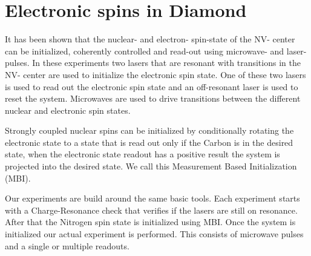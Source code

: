 \chapter{Electronic spins in Diamond}
\label{controlingspinsindiamond}




It has been shown that the nuclear- and electron- spin-state of the NV- center can be initialized, coherently controlled and read-out using microwave- and laser- pulses\citep{Robledo2011HighFidelity}. In these experiments two lasers that are resonant with transitions in the NV- center are used to initialize the electronic spin state. One of these two lasers is used to read out the electronic spin state and an off-resonant laser is used to reset the system.  Microwaves are used to drive transitions between the different nuclear and electronic spin states.

Strongly coupled nuclear spins can be initialized by conditionally rotating the electronic state to a state that is read out only if the Carbon is in the desired state, when the electronic state readout has a positive result the system is projected into the desired state. We call this Measurement Based Initialization (MBI).

%
%
Our experiments are build around the same basic tools. Each experiment starts with a Charge-Resonance check that verifies if the lasers are still on resonance. After that the Nitrogen spin state is initialized using MBI. Once the system is initialized our actual experiment is performed. This consists of microwave pulses and a single or multiple readouts.

